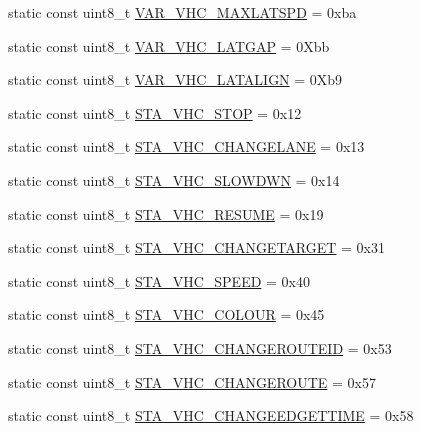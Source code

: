 \begin{DoxyCompactItemize}
static const uint8\+\_\+t \hyperlink{classtraci__api_1_1_vehicle_manager_a927209bd0f94d9e2a7542356d74b89e7}{V\+A\+R\+\_\+\+V\+H\+C\+\_\+\+M\+A\+X\+L\+A\+T\+S\+PD} = 0xba
\item 
static const uint8\+\_\+t \hyperlink{classtraci__api_1_1_vehicle_manager_ae668bae1944b885b0d6c946d3df3b5ec}{V\+A\+R\+\_\+\+V\+H\+C\+\_\+\+L\+A\+T\+G\+AP} = 0\+Xbb
\item 
static const uint8\+\_\+t \hyperlink{classtraci__api_1_1_vehicle_manager_a3866fb6c1b6d1a0011455300f40a18cb}{V\+A\+R\+\_\+\+V\+H\+C\+\_\+\+L\+A\+T\+A\+L\+I\+GN} = 0\+Xb9
\item 
static const uint8\+\_\+t \hyperlink{classtraci__api_1_1_vehicle_manager_a9fcda576e35eb8c34ad6fd4808221acc}{S\+T\+A\+\_\+\+V\+H\+C\+\_\+\+S\+T\+OP} = 0x12
\item 
static const uint8\+\_\+t \hyperlink{classtraci__api_1_1_vehicle_manager_a650f7cfb39b3f3dab9c06612bb401b34}{S\+T\+A\+\_\+\+V\+H\+C\+\_\+\+C\+H\+A\+N\+G\+E\+L\+A\+NE} = 0x13
\item 
static const uint8\+\_\+t \hyperlink{classtraci__api_1_1_vehicle_manager_acb211c131fc74c5e73bbeea542c3eb1a}{S\+T\+A\+\_\+\+V\+H\+C\+\_\+\+S\+L\+O\+W\+D\+WN} = 0x14
\item 
static const uint8\+\_\+t \hyperlink{classtraci__api_1_1_vehicle_manager_ad6cf6390198a926c352e9573274f17bc}{S\+T\+A\+\_\+\+V\+H\+C\+\_\+\+R\+E\+S\+U\+ME} = 0x19
\item 
static const uint8\+\_\+t \hyperlink{classtraci__api_1_1_vehicle_manager_a20db78dac81e4bfe3883327d6ac4dffc}{S\+T\+A\+\_\+\+V\+H\+C\+\_\+\+C\+H\+A\+N\+G\+E\+T\+A\+R\+G\+ET} = 0x31
\item 
static const uint8\+\_\+t \hyperlink{classtraci__api_1_1_vehicle_manager_ab660207279fb64c012d1bf7eaeece414}{S\+T\+A\+\_\+\+V\+H\+C\+\_\+\+S\+P\+E\+ED} = 0x40
\item 
static const uint8\+\_\+t \hyperlink{classtraci__api_1_1_vehicle_manager_a60ca45b4d097f18bc8370ed98b712944}{S\+T\+A\+\_\+\+V\+H\+C\+\_\+\+C\+O\+L\+O\+UR} = 0x45
\item 
static const uint8\+\_\+t \hyperlink{classtraci__api_1_1_vehicle_manager_a3373c7c01e939ddc8b83e9a6d650ef8e}{S\+T\+A\+\_\+\+V\+H\+C\+\_\+\+C\+H\+A\+N\+G\+E\+R\+O\+U\+T\+E\+ID} = 0x53
\item 
static const uint8\+\_\+t \hyperlink{classtraci__api_1_1_vehicle_manager_ab2864115d4a4d0b3418f7c0c336f7b50}{S\+T\+A\+\_\+\+V\+H\+C\+\_\+\+C\+H\+A\+N\+G\+E\+R\+O\+U\+TE} = 0x57
\item 
static const uint8\+\_\+t \hyperlink{classtraci__api_1_1_vehicle_manager_a90e63ce9894d2784451505ef43a02d7c}{S\+T\+A\+\_\+\+V\+H\+C\+\_\+\+C\+H\+A\+N\+G\+E\+E\+D\+G\+E\+T\+T\+I\+ME} = 0x58

\end{DoxyCompactItemize}
